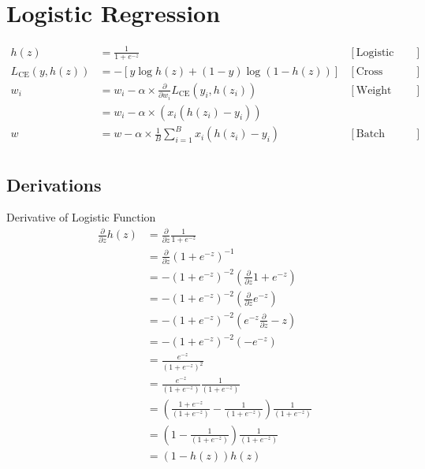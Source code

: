 \section{Logistic Regression}

\begin{align*}
    h(z) &= \frac{1}{1 + e^{-z}} & [\text{Logistic Function}] \\
    L_{\text{CE}}(y, h(z)) &= -\left[y\log h(z) + (1-y)\log(1-h(z))\right] & [\text{Cross Entropy Loss}] \\
    w_i &= w_i - \alpha \times \frac{\partial}{\partial w_i} L_{\text{CE}}(y_i, h(z_i)) & [\text{Weight Update}]\\
    &= w_i - \alpha \times (x_i (h(z_i) - y_i)) \\
    w &= w - \alpha \times \frac{1}{B}\sum^{B}_{i=1} x_i (h(z_i) - y_i) & [\text{Batch Weight Update}]\\
\end{align*}



\subsection{Derivations}
Derivative of Logistic Function\\

\begin{align*}
    \frac{\partial}{\partial z} h(z) &= \frac{\partial}{\partial z} \frac{1}{1+e^{-z}} \\
    &= \frac{\partial}{\partial z} (1 + e^{-z})^{-1} \\
    &= -(1 + e^{-z})^{-2} \left(\frac{\partial}{\partial z} 1 + e^{-z}\right) \\
    &= -(1 + e^{-z})^{-2} \left(\frac{\partial}{\partial z} e^{-z}\right) \\
    &= -(1 + e^{-z})^{-2} \left(e^{-z} \frac{\partial}{\partial z} -z\right) \\
    &= -(1 + e^{-z})^{-2} (-e^{-z})\\
    &= \frac{e^{-z}}{(1+e^{-z})^2} \\
    &= \frac{e^{-z}}{(1+e^{-z})}\frac{1}{(1 + e^{-z})}\\
    &= \left(\frac{1+e^{-z}}{(1+e^{-z})} - \frac{1}{(1+e^{-z})}\right)\frac{1}{(1 + e^{-z})}\\
    &= \left(1 - \frac{1}{(1+e^{-z})}\right)\frac{1}{(1 + e^{-z})}\\
    &= (1-h(z))h(z)\\
\end{align*}


